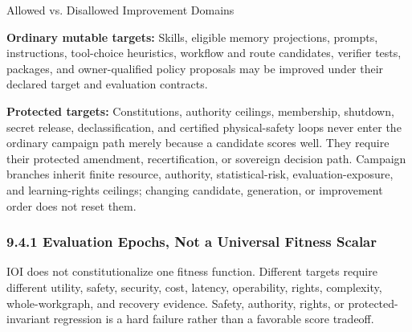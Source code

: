 \documentclass[
  11pt,
]{article}
\begin{document}
\begin{center}
\end{center}


Allowed vs. Disallowed Improvement Domains

\textbf{Ordinary mutable targets:} Skills, eligible memory projections,
prompts, instructions, tool-choice heuristics, workflow and route candidates,
verifier tests, packages, and owner-qualified policy proposals may be improved
under their declared target and evaluation contracts.

\textbf{Protected targets:} Constitutions, authority ceilings, membership,
shutdown, secret release, declassification, and certified physical-safety
loops never enter the ordinary campaign path merely because a candidate scores
well. They require their protected amendment, recertification, or sovereign
decision path. Campaign branches inherit finite resource, authority,
statistical-risk, evaluation-exposure, and learning-rights ceilings; changing
candidate, generation, or improvement order does not reset them.

\hypertarget{the-fitness-function-the-evaluator}{%
\subsubsection{9.4.1 Evaluation Epochs, Not a Universal Fitness
Scalar}\label{the-fitness-function-the-evaluator}}

IOI does not constitutionalize one fitness function. Different targets require
different utility, safety, security, cost, latency, operability, rights,
complexity, whole-workgraph, and recovery evidence. Safety, authority, rights,
or protected-invariant regression is a hard failure rather than a favorable
score tradeoff.
\end{document}
